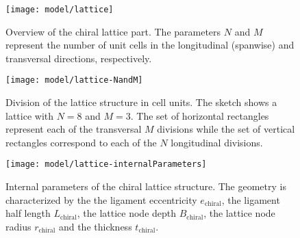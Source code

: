 \begin{figure}[!htpb]
  \centering
  \texttt{[image: model/lattice]}
  \caption[Overview of the chiral lattice part]{Overview of the chiral lattice part. The parameters $N$ and $M$ represent the number of unit cells in the longitudinal (spanwise) and transversal directions, respectively.}\label{fig:lattice}
\end{figure}

\begin{figure}[!htpb]
  \centering
  \texttt{[image: model/lattice-NandM]}
  \caption[Division of the lattice structure in cell units]{Division of the lattice structure in cell units. The sketch shows a lattice with $N = 8$ and $M = 3$. The set of horizontal rectangles represent each of the transversal $M$ divisions while the set of vertical rectangles correspond to each of the $N$ longitudinal divisions.}\label{fig:lattice-NandM}
\end{figure}

\begin{figure}[!htpb]
  \centering
  \texttt{[image: model/lattice-internalParameters]}
  \caption[Internal parameters of the chiral lattice structure]{Internal parameters of the chiral lattice structure. The geometry is characterized by the the ligament eccentricity $e_{\mathrm{chiral}}$, the ligament half length $L_{\mathrm{chiral}}$, the lattice node depth $B_{\mathrm{chiral}}$, the lattice node radius $r_{\mathrm{chiral}}$ and the thickness $t_{\mathrm{chiral}}$.}\label{fig:lattice-internalParameters}
\end{figure}

